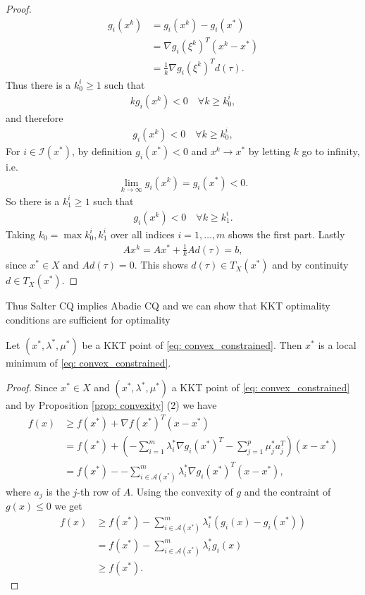 \begin{proof}
\begin{align}
    g_i(x^{k})
    &= g_i(x^{k}) - g_i(x^{*}) \\
    &= \nabla g_i(\xi^{k})^{T} (x^{k} -x^{*} ) \\
    &= \frac{1}{k} \nabla g_i (\xi^{k})^{T} d(\tau).
\end{align}
Thus there is a $k^i_0\ge1$ such that
\begin{align}
    kg_i(x^{k}) < 0 \quad \forall k \ge k_0^{i},
\end{align}
and therefore
\begin{align}
    g_i(x^{k}) < 0 \quad \forall k \ge k_0^{i},
\end{align}
For $i \in \mathcal{I}(x^{*})$, by definition $g_i(x^{*}) < 0$ and $x^{k} \to
x^{*}$ by letting $k$ go to infinity, i.e.
\begin{align}
    \lim_{k \to \infty} g_i(x^{k}) = g_i (x^{*}) < 0.
\end{align}
So there is a $k_1^{i} \ge 1$ such that
\begin{align}
    g_i(x^{k}) < 0 \quad \forall k \ge k_1^{i}.
\end{align}
Taking $k_0 = \max{k_0^{i} , k_1^{i}}$ over all indices $i = 1,\ldots,m$
shows the first part. Lastly
\begin{align}
    Ax^{k} = A x^{*}  + \frac{1}{k}Ad(\tau) = b,
\end{align}
since $x^{*} \in X$ and $Ad(\tau) = 0$. This shows $d(\tau) \in T_X(x^{*})$
and by continuity $d \in T_X(x^{*})$.
\end{proof}
Thus Salter CQ implies Abadie CQ and we can show that KKT optimality
conditions are sufficient for optimality
\begin{theorem}
    Let $(x^{*}, \lambda^{*},\mu^{*})$ be a KKT point of
    \ref{eq: convex_constrained}. Then $x^{*}$ is a local minimum of
    \ref{eq: convex_constrained}.
\end{theorem}
\begin{proof}
    Since $x^{*} \in X$ and $(x^{*}, \lambda^{*}, \mu^{*})$ a KKT point of
    \ref{eq: convex_constrained} and by Proposition \ref{prop: convexity} (2)
    we have
    \begin{align}
        f(x)
        &\ge f(x^{*}) + \nabla f(x^{*})^{T}(x-x^{*})\\
        &= f(x^{*}) + \left(
        -\sum_{i=1}^{m} \lambda_i^{*}\nabla g_i(x^{*})^{T}
        -\sum_{j=1}^{p} \mu_j^{*} a_j^{T}
    \right)(x-x^{*})\\
        &= f(x^{*}) -
        -\sum_{i\in\mathcal{A}(x^{*})}^{m} \lambda_i^{*}\nabla g_i(x^{*})^{T}
    (x-x^{*}),
    \end{align}
    where $a_j$ is the $j$-th row of $A$. Using the convexity of $g$ and the
    contraint of $g(x) \le 0$ we get
    \begin{align}
        f(x)
        &\ge f(x^{*})
        -\sum_{i\in\mathcal{A}(x^{*})}^{m} \lambda_i^{*}
        \left( g_i(x) -g_i(x^{*})  \right)\\
        &= f(x^{*})
        -\sum_{i\in\mathcal{A}(x^{*})}^{m} \lambda_i^{*}
        g_i(x)\\
        &\ge f(x^{*}).
    \end{align}
\end{proof}


